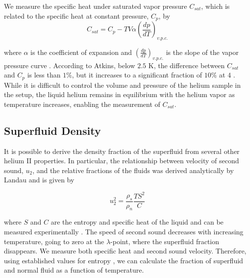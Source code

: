 We measure the specific heat under saturated vapor pressure $C_{sat}$,
which is related to the specific heat at constant pressure, $C_p$, by
\begin{equation}\label{formula:satspecificheat}
C_{sat} = C_p - TV\alpha\left(\dfrac{dp}{dT}\right)_{v.p.c.} 
\end{equation}

where $\alpha$ is the coefficient of expansion and
$\left(\frac{dp}{dT}\right)_{v.p.c.}$ is the slope of the vapor
pressure curve \cite{atkins}. According to Atkins, below $2.5$ K, the
difference between $C_{sat}$ and $C_p$ is less than $1\%$, but it
increases to a significant fraction of $10\%$ at $4$
\cite{atkins}. While it is difficult to control the volume and
pressure of the helium sample in the setup, the liquid helium
remains in equilibrium with the helium vapor as temperature increases,
enabling the measurement of $C_{sat}$.

\subsection{Superfluid Density}

It is possible to derive the density fraction of the superfluid from
several other helium II properties. In particular, the relationship
between velocity of second sound, $u_2$, and the relative fractions of
the fluids was derived analytically by Landau and is given by

\begin{equation}
u_2^2 = \frac{\rho_s}{\rho_n}\frac{T S^2}{C}
\label{soundspeed}
\end{equation}

where $S$ and $C$ are the entropy and specific heat of the liquid and
can be measured experimentally \cite{atkins}. The speed of second
sound decreases with increasing temperature, going to zero at the
$\lambda$-point, where the superfluid fraction disappears. We measure
both specific heat and second sound velocity.  Therefore, using
established values for entropy \cite{brooks}, we can calculate the
fraction of superfluid and normal fluid as a function of temperature.
